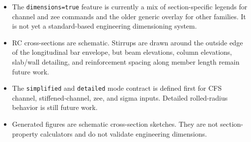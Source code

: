 \documentclass[10pt]{article}
\newcommand{\keyname}[1]{\texttt{#1}}
\begin{document}
\begin{itemize}
  \item The \keyname{dimensions=true} feature is currently a mix of
  section-specific legends for channel and zee commands and the older generic
  overlay for other families. It is not yet a standard-based engineering
  dimensioning system.
  \item RC cross-sections are schematic. Stirrups are drawn around the outside
  edge of the longitudinal bar envelope, but beam elevations, column elevations,
  slab/wall detailing, and reinforcement spacing along member length remain
  future work.
  \item The \keyname{simplified} and \keyname{detailed} mode contract is defined
  first for CFS channel, stiffened-channel, zee, and sigma inputs. Detailed
  rolled-radius behavior is still future work.
  \item Generated figures are schematic cross-section sketches. They are not
  section-property calculators and do not validate engineering dimensions.
\end{itemize}
\end{document}
